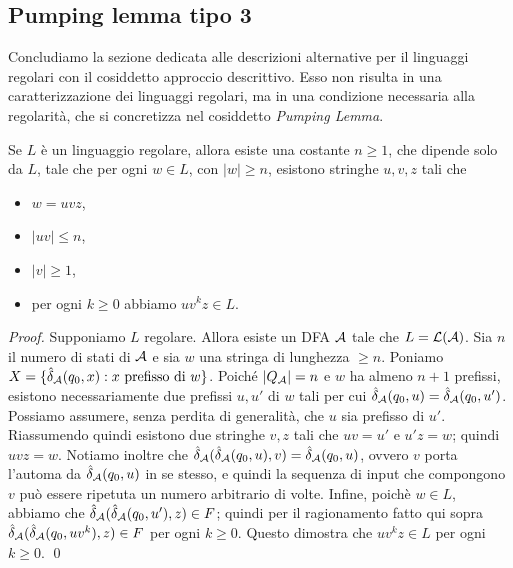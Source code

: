 \documentclass[runningheads,a4paper]{llncs}
\begin{document}
\subsection{Pumping lemma tipo 3}

Concludiamo la sezione dedicata alle descrizioni alternative per il linguaggi regolari con il cosiddetto approccio descrittivo. Esso non risulta in una caratterizzazione dei linguaggi regolari, ma in una condizione necessaria alla regolarit\`{a}, che si concretizza nel cosiddetto \emph{Pumping Lemma}. 

\begin{lemma}\label{lem:pumping3}
Se $L$ \`{e} un linguaggio regolare, allora esiste una costante $n \geq 1$, che dipende solo da $L$, tale che per ogni $w \in L$, con $|w| \geq n$, esistono stringhe $u,v,z$ tali che 
\begin{itemize}
  \item $w = uvz$,
  \item $|uv| \leq n$,
  \item $|v| \geq 1$,
  \item per ogni $k \geq 0$ abbiamo $uv^kz \in L$.
\end{itemize}
\end{lemma}

\begin{proof}
Supponiamo $L$ regolare. Allora esiste un DFA $\mathcal{A}$ tale che $L = \mathcal{L}(\mathcal{A})$. Sia $n$ il numero di stati di $\mathcal{A}$ e sia $w$ una stringa di lunghezza $\geq n$. Poniamo $X = \{\hat{\delta}_{\mathcal{A}}(q_0,x) : x \mbox{ prefisso di } w\}$. Poich\'{e} $|Q_{\mathcal{A}}| = n$ e $w$ ha almeno $n+1$ prefissi, esistono necessariamente due prefissi $u,u'$ di $w$ tali per cui $\hat{\delta}_{\mathcal{A}}(q_0,u) = \hat{\delta}_{\mathcal{A}}(q_0,u')$. Possiamo assumere, senza perdita di generalit\`{a}, che $u$ sia prefisso di $u'$. Riassumendo quindi esistono due stringhe $v,z$ tali che $uv = u'$ e $u'z = w$; quindi $uvz = w$. Notiamo inoltre che $\hat{\delta}_{\mathcal{A}}(\hat{\delta}_{\mathcal{A}}(q_0,u),v) = \hat{\delta}_{\mathcal{A}}(q_0,u)$, ovvero $v$ porta l'automa da $\hat{\delta}_{\mathcal{A}}(q_0,u)$ in se stesso, e quindi la sequenza di input che compongono $v$ pu\`{o} essere ripetuta un numero arbitrario di volte. Infine, poich\`{e} $w \in L$, abbiamo che $\hat{\delta}_{\mathcal{A}}(\hat{\delta}_{\mathcal{A}}(q_0,u'),z) \in F$; quindi per il ragionamento fatto qui sopra $\hat{\delta}_{\mathcal{A}}(\hat{\delta}_{\mathcal{A}}(q_0,uv^k),z) \in F$ per ogni $k \geq 0$. Questo dimostra che $uv^kz \in L$ per ogni $k \geq 0$.
\qed\end{proof}
\end{document}
